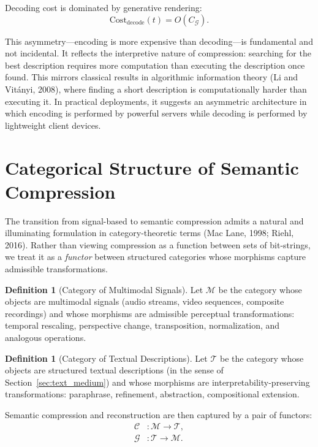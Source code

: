 \documentclass[11pt,a4paper]{article}
\theoremstyle{definition}
\newtheorem{definition}[theorem]{Definition}
\theoremstyle{remark}
\begin{document}
Decoding cost is dominated by generative rendering:
\[
\mathrm{Cost}_{\mathrm{decode}}(t) = O(C_{\mathcal{G}}).
\]

This asymmetry---encoding is more expensive than decoding---is fundamental and not incidental. It reflects the interpretive nature of compression: searching for the best description requires more computation than executing the description once found. This mirrors classical results in algorithmic information theory (Li and Vit\'{a}nyi, 2008), where finding a short description is computationally harder than executing it. In practical deployments, it suggests an asymmetric architecture in which encoding is performed by powerful servers while decoding is performed by lightweight client devices.

\section{Categorical Structure of Semantic Compression}
\label{sec:categorical}

The transition from signal-based to semantic compression admits a natural and illuminating formulation in category-theoretic terms (Mac Lane, 1998; Riehl, 2016). Rather than viewing compression as a function between sets of bit-strings, we treat it as a \emph{functor} between structured categories whose morphisms capture admissible transformations.

\begin{definition}[Category of Multimodal Signals]
Let $\mathcal{M}$ be the category whose objects are multimodal signals (audio streams, video sequences, composite recordings) and whose morphisms are admissible perceptual transformations: temporal rescaling, perspective change, transposition, normalization, and analogous operations.
\end{definition}

\begin{definition}[Category of Textual Descriptions]
Let $\mathcal{T}$ be the category whose objects are structured textual descriptions (in the sense of Section~\ref{sec:text_medium}) and whose morphisms are interpretability-preserving transformations: paraphrase, refinement, abstraction, compositional extension.
\end{definition}

Semantic compression and reconstruction are then captured by a pair of functors:
\begin{align}
\mathcal{C} &: \mathcal{M} \rightarrow \mathcal{T}, \\
\mathcal{G} &: \mathcal{T} \rightarrow \mathcal{M}.
\end{align}
\end{document}
